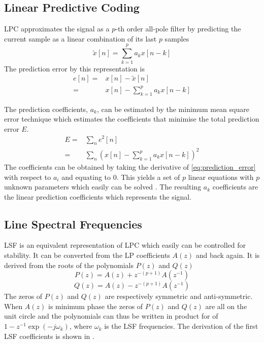 \subsection{Linear Predictive Coding} %
\label{sub:lpc}
LPC approximates the signal as a $p$-th order all-pole filter by predicting the current sample as a linear combination of its last $p$ samples \cite{digsig}
\begin{equation}
	\tilde{x}[n] = \sum_{k=1}^{p}a_k x[n-k]
\end{equation}
The prediction error by this representation is 
\begin{equation}
	\begin{split}
		e[n]= & x[n]-\tilde{x}[n]\\
		= & x[n]-\sum_{k=1}^{p}a_k x[n-k]
	\end{split}
\end{equation}

The prediction coefficients, $a_k$, can be estimated by the minimum mean square error technique which estimates the coefficients that minimise the total prediction error $E$.
\begin{equation}
	\label{eq:prediction_error}
	\begin{split}
		E = & \sum_{n}e^2[n]\\
		= & \sum_{n}\left( x[n]-\sum_{k=1}^{p}a_k x[n-k] \right)^2
	\end{split}
\end{equation}
The coefficients can be obtained by taking the derivative of \eqref{eq:prediction_error} with respect to $a_i$ and equating to 0. This yields a set of $p$ linear equations with $p$ unknown parameters which easily can be solved \cite{digsig}. The resulting $a_k$ coefficients are the linear prediction coefficients which represents the signal.

\subsection{Line Spectral Frequencies} %
\label{sub:line_spectral_frequencies}
LSF is an equivalent representation of LPC which easily can be controlled for stability. It can be converted from the LP coefficients $A(z)$ and back again. It is derived from the roots of the polynomials $P(z)$ and $Q(z)$ 
\begin{equation}
	\label{eq:p_z}
	P(z) = A(z)+z^{-(p+1)}A(z^{-1})
\end{equation}
\begin{equation}
	\label{eq:q_z}
	Q(z) = A(z)-z^{-(p+1)}A(z^{-1})
\end{equation}
The zeros of $P(z)$ and $Q(z)$ are respectively symmetric and anti-symmetric. When $A(z)$ is minimum phase the zeros of $P(z)$ and $Q(z)$ are all on the unit circle and the polynomials can thus be written in product for of
$1-z^{-1}\exp(-j\omega_k)$, where $\omega_k$ is the LSF frequencies. The derivation of the first LSF coefficients is shown in \cite[p. 304]{taletek}.

